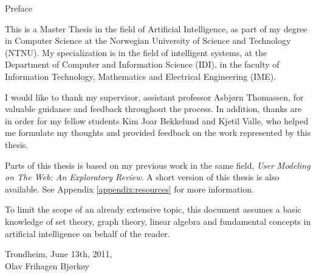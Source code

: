 \null\vspace{7em}
{
  \centering
  \normalfont
  \huge
  \noindent
  Preface\\
}
\vspace{2em}

\noindent
This is a Master Thesis in the field of Artificial Intelligence,
as part of my degree in Computer Science
at the Norwegian University of Science and Technology (NTNU).
My specialization is in the field of intelligent systems, 
at the Department of Computer and Information Science (IDI), 
in the faculty of Information Technology, Mathematics and Electrical Engineering (IME).

I would like to thank my supervisor, assistant professor Asbjørn Thomassen, for valuable guidance and feedback throughout the process.
In addition, thanks are in order for my fellow students 
Kim Joar Bekkelund and Kjetil Valle,
who helped me formulate my thoughts and provided feedback on the work represented by this thesis.

Parts of this thesis is based on my previous work in the same field, 
\emph{User Modeling on The Web: An Exploratory Review}.
A short version of this thesis is also available.
See Appendix \ref{appendix:resources} for more information.

To limit the scope of an already extensive topic, 
this document assumes a basic knowledge of set theory, 
graph theory, linear algebra and fundamental concepts in artificial intelligence 
on behalf of the reader.

\vspace{1em}
\begin{flushleft}
  Trondheim, June 13th, 2011,\\
  Olav Frihagen Bjørkøy\\
\end{flushleft}

\cleardoublepage
